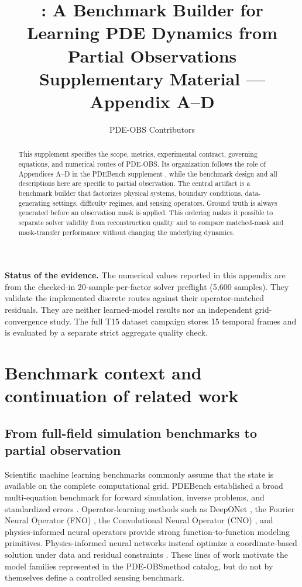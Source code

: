 \documentclass[10pt]{article}
\title{\vspace{-1.0cm}\textbf{\dataset: A Benchmark Builder for Learning PDE Dynamics from Partial Observations}\\[2mm]
\large Supplementary Material --- Appendix A--D}
\author{PDE-OBS Contributors}
\date{}
\newcommand{\dataset}{\textsc{PDE-OBS}}
\begin{document}
\maketitle
\vspace{-1.2em}

\begin{abstract}
This supplement specifies the scope, metrics, experimental contract, governing
equations, and numerical routes of \dataset.  Its organization follows the
role of Appendices A--D in the PDEBench supplement \citep{takamoto2022pdebench},
while the benchmark design and all descriptions here are specific to partial
observation.  The central artifact is a benchmark builder that factorizes
physical systems, boundary conditions, data-generating settings, difficulty
regimes, and sensing operators.  Ground truth is always generated before an
observation mask is applied.  This ordering makes it possible to separate
solver validity from reconstruction quality and to compare matched-mask and
mask-transfer performance without changing the underlying dynamics.
\end{abstract}

\noindent\colorbox{PDELight}{\parbox{0.965\linewidth}{\textbf{Status of the evidence.}
The numerical values reported in this appendix are from the checked-in
20-sample-per-factor solver preflight (5,600 samples).  They validate the
implemented discrete routes against their operator-matched residuals.  They
are neither learned-model results nor an independent grid-convergence study.
The full T15 dataset campaign stores 15 temporal frames and is evaluated by a
separate strict aggregate quality check.}}

\appendix
\fi

\section{Benchmark context and continuation of related work}
\label{sec:context}

\subsection{From full-field simulation benchmarks to partial observation}

Scientific machine learning benchmarks commonly assume that the state is
available on the complete computational grid.  PDEBench established a broad
multi-equation benchmark for forward simulation, inverse problems, and
standardized errors \citep{takamoto2022pdebench}.  Operator-learning methods
such as DeepONet \citep{lu2021deeponet}, the Fourier Neural Operator (FNO)
\citep{li2021fno}, the Convolutional Neural Operator (CNO)
\citep{kovachki2023cno}, and physics-informed neural operators
\citep{li2021pino} provide strong function-to-function modeling primitives.
Physics-informed neural networks instead optimize a coordinate-based solution
under data and residual constraints \citep{raissi2019pinns}.  These lines of
work motivate the model families represented in the \dataset method catalog,
but do not by themselves define a controlled sensing benchmark.
\end{document}
